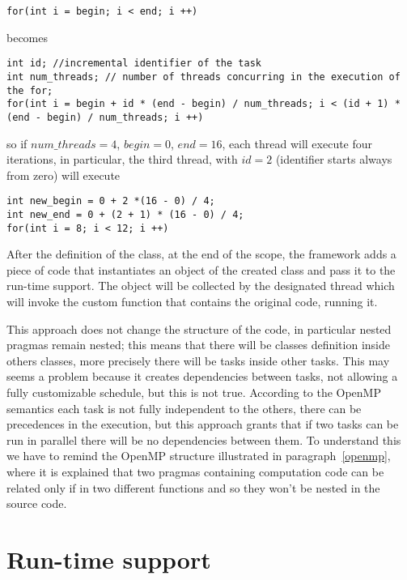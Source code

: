 \documentclass[a4paper,11pt,oneside]{book}
\begin{document}
\begin{lstlisting}[language=CCC]
for(int i = begin; i < end; i ++)
\end{lstlisting}

becomes

\begin{lstlisting}[language=CCC]
int id; //incremental identifier of the task
int num_threads; // number of threads concurring in the execution of the for;
for(int i = begin + id * (end - begin) / num_threads; i < (id + 1) * (end - begin) / num_threads; i ++)
\end{lstlisting}

so if $num\_threads  = 4$, $begin = 0$, $end = 16$, each thread will execute four iterations, in particular, the third thread, with $id = 2$ (identifier starts always from zero) will execute

\begin{lstlisting}[language=CCC]
int new_begin = 0 + 2 *(16 - 0) / 4;
int new_end = 0 + (2 + 1) * (16 - 0) / 4;
for(int i = 8; i < 12; i ++)
\end{lstlisting}

After the definition of the class, at the end of the scope, the framework adds a piece of code that instantiates an object of the created class and pass it to the run-time support. The object will be collected by the designated thread which will invoke the custom function that contains the original code, running it. 

This approach does not change the structure of the code, in particular nested pragmas remain nested; this means that there will be classes definition inside others classes, more precisely there will be tasks inside other tasks. This may seems a problem because it creates dependencies between tasks, not allowing a fully customizable schedule, but this is not true. According to the OpenMP semantics each task is not fully independent to the others, there can be precedences in the execution, but this approach grants that if two tasks can be run in parallel there will be no dependencies between them. To understand this we have to remind the OpenMP structure illustrated in paragraph~\ref{openmp}, where it is explained that two pragmas containing computation code  can be related only if in two different functions and so they won't be nested in the source code. 




\section{Run-time support}
\end{document}
